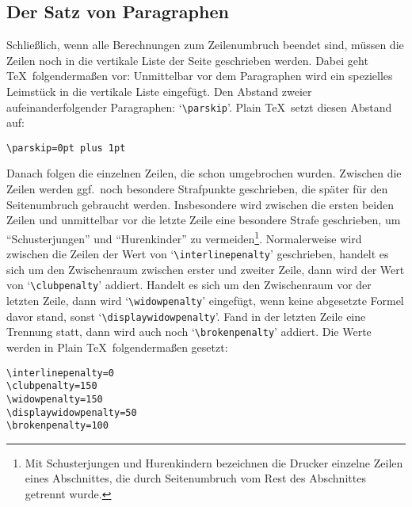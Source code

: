 \subsection{Der Satz von Paragraphen}
Schlie\ss{}lich, wenn alle Berechnungen zum Zeilenumbruch beendet sind,
m\"ussen die Zeilen noch in die vertikale Liste der Seite geschrieben
werden. Dabei geht \TeX\ folgenderma\ss{}en vor: Unmittelbar vor dem
Paragraphen wird ein spezielles Leimst\"uck in die vertikale Liste
eingef\"ugt. Den 
Abstand zweier aufeinanderfolgender Paragraphen:
`\verb|\parskip|'. Plain \TeX\ setzt diesen Abstand auf:
\begin{verbatim}
\parskip=0pt plus 1pt
\end{verbatim}
Danach folgen die einzelnen Zeilen, die schon umgebrochen wurden.
Zwischen die Zeilen werden ggf.\ noch besondere Strafpunkte
geschrieben, die sp\"ater f\"ur den Seitenumbruch gebraucht werden.
Insbesondere wird zwischen die ersten beiden Zeilen und unmittelbar
vor die letzte Zeile eine besondere 
Strafe geschrieben, um
``Schusterjungen'' und 
``Hurenkinder'' zu vermeiden\footnote{Mit Schusterjungen und Hurenkindern
bezeichnen die Drucker einzelne Zeilen eines Abschnittes, die durch Seitenumbruch
vom Rest des Abschnittes getrennt wurde.}. Normalerweise wird zwischen die Zeilen
der Wert von 
`\verb|\interlinepenalty|'
geschrieben, handelt es sich um den 
Zwischenraum zwischen erster und
zweiter Zeile, dann wird der Wert von 
`\verb|\clubpenalty|' addiert.
Handelt es sich um den 
Zwischenraum vor der letzten Zeile, dann wird
`\verb|\widowpenalty|' eingef\"ugt, wenn keine 
abgesetzte Formel davor
stand, sonst 
`\verb|\displaywidowpenalty|'. Fand in der letzten Zeile
eine Trennung statt, dann wird auch noch
`\verb|\brokenpenalty|'
addiert. Die Werte werden in Plain \TeX\ folgenderma\ss{}en gesetzt:
\begin{verbatim}
\interlinepenalty=0
\clubpenalty=150
\widowpenalty=150
\displaywidowpenalty=50
\brokenpenalty=100
\end{verbatim}

